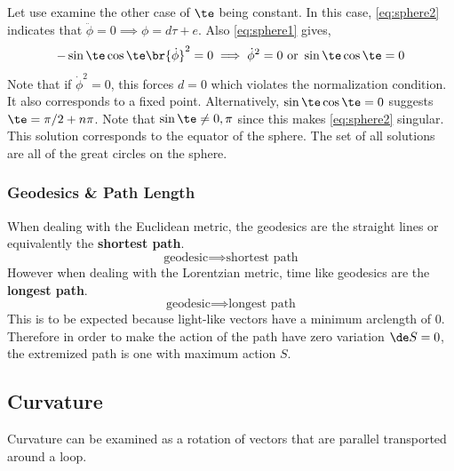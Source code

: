 \documentclass{article}
\begin{document}
Let use examine the other case of $\te$ being constant. In this case, \eqref{eq:sphere2} indicates that $\ddot{\phi}= 0 \implies \phi = d \tau + e$. Also \eqref{eq:sphere1} gives,
\[ -\sin\te \cos\te \br{\dot{\phi}}^2 = 0 \implies \dot{\phi}^2 = 0  \text{ or } \sin\te\cos\te = 0 \]
Note that if $\dot{\phi}^2 = 0$, this forces $d=0$ which violates the normalization condition. It also corresponds to a fixed point. Alternatively, $\sin\te\cos\te = 0$ suggests $\te = \pi / 2 + n\pi$. Note that $\sin \te \neq 0, \pi$ since this makes \eqref{eq:sphere2} singular. This solution corresponds to the equator of the sphere. The set of all solutions are all of the great circles on the sphere.

\subsubsection{Geodesics \& Path Length}

When dealing with the Euclidean metric, the geodesics are the straight lines or equivalently the \textbf{shortest path}.
\[ \text{geodesic} \implies \text{shortest path} \]
However when dealing with the Lorentzian metric, time like geodesics are the \textbf{longest path}.
\[ \text{geodesic} \implies \text{longest path} \]
This is to be expected because light-like vectors have a minimum arclength of $0$. Therefore in order to make the action of the path have zero variation $\de S = 0$, the extremized path is one with maximum action $S$.

\subsection{Curvature}

Curvature can be examined as a rotation of vectors that are parallel transported around a loop.
\begin{center}
\end{center}
\end{document}
